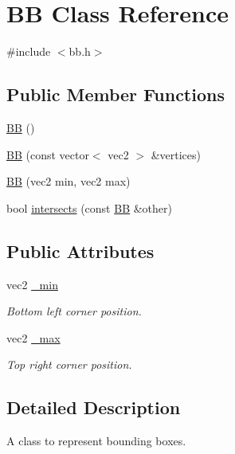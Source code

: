 \hypertarget{class_b_b}{\section{B\+B Class Reference}
\label{class_b_b}
}


{\ttfamily \#include $<$bb.\+h$>$}

\subsection*{Public Member Functions}
\begin{DoxyCompactItemize}
\item 
\hyperlink{class_b_b_a2a4045c7f1088d63abbd3d54dbe985d5}{B\+B} ()
\item 
\hyperlink{class_b_b_a6e7aa56c3e9c2621a95161b4d7d0629b}{B\+B} (const vector$<$ vec2 $>$ \&vertices)
\item 
\hyperlink{class_b_b_a56418218da01e8e85e376b44ca79693a}{B\+B} (vec2 min, vec2 max)
\item 
bool \hyperlink{class_b_b_a4fac3908f12a10c7ce39529c16688a6f}{intersects} (const \hyperlink{class_b_b}{B\+B} \&other)
\end{DoxyCompactItemize}
\subsection*{Public Attributes}
\begin{DoxyCompactItemize}
\item 
vec2 \hyperlink{class_b_b_a4b3364614ae922eefae03a902422c289}{\+\_\+min}
\begin{DoxyCompactList}\small\item\em Bottom left corner position. \end{DoxyCompactList}\item 
vec2 \hyperlink{class_b_b_af3061cea04192cbe6f1ff43cea019a2d}{\+\_\+max}
\begin{DoxyCompactList}\small\item\em Top right corner position. \end{DoxyCompactList}\end{DoxyCompactItemize}


\subsection{Detailed Description}
A class to represent bounding boxes. 


